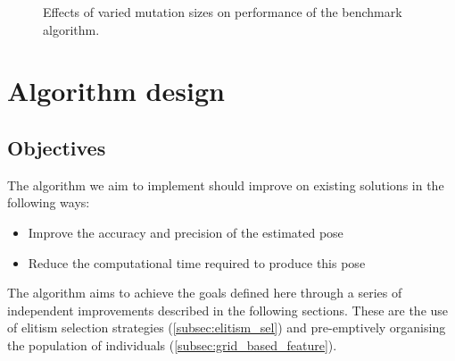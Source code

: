 \documentclass[authoryearcitations]{UoYCSproject}
\begin{document}
\begin{figure}[ht]
	\centering
	\caption[Optimising mutation step size for the benchmark algorithm.]{Effects of varied mutation sizes on performance of the benchmark algorithm.}
	\label{fig:benchmark_mutsize}
\end{figure}


\chapter{Algorithm design}
\section{Objectives}
\label{sec:objectives}
The algorithm we aim to implement should improve on existing solutions in the following ways:
\begin{itemize}
	\item Improve the accuracy and precision of the estimated pose
	\item Reduce the computational time required to produce this pose
\end{itemize}

The algorithm aims to achieve the goals defined here through a series of independent improvements described in the following sections. These are the use of elitism selection strategies (\autoref{subsec:elitism_sel}) and pre-emptively organising the population of individuals (\autoref{subsec:grid_based_feature}).
\end{document}
